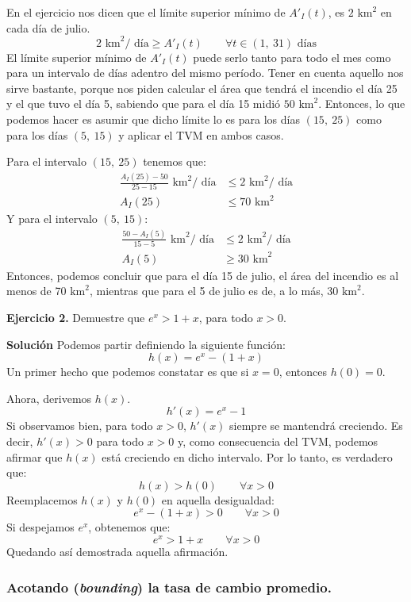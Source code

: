 \documentclass[12pt]{article}
\begin{document}
En el ejercicio nos dicen que el límite superior mínimo de $A'_{I}(t)$, es $2 \text{ km}^{2}$ en cada día de julio.
\[
  2 \text{ km}^{2} / \text{ día} \geq A'_{I}(t) \qquad \forall t \in (1, \ 31) \text{ días}
\]
El límite superior mínimo de $A'_{I}(t)$ puede serlo tanto para todo el mes como para un intervalo de días adentro del mismo período. Tener en cuenta aquello nos sirve bastante, porque nos piden calcular el área que tendrá el incendio el día 25 y el que tuvo el día 5, sabiendo que para el día 15 midió $50 \text{ km}^{2}$. Entonces, lo que podemos hacer es asumir que dicho límite lo es para los días $(15, \ 25)$ como para los días $(5, \ 15)$ y aplicar el TVM en ambos casos.

Para el intervalo $(15, \ 25)$ tenemos que:
\begin{align*}
\frac{A_{I}(25) - 50}{25 - 15} \text{ km}^{2}/ \text{ día} &\leq 2 \text{ km}^{2}/ \text{ día} \\
A_{I}(25) &\leq 70 \text{ km}^{2}
\end{align*}
Y para el intervalo $(5, \ 15)$:
\begin{align*}
\frac{50 - A_{I}(5)}{15 - 5} \text{ km}^{2}/ \text{ día} &\leq 2 \text{ km}^{2}/ \text{ día} \\
A_{I}(5) &\geq 30 \text{ km}^{2}
\end{align*}
Entonces, podemos concluir que para el día 15 de julio, el área del incendio es al menos de 70 $\text{km}^{2}$, mientras que para el 5 de julio es de, a lo más, 30 $\text{km}^{2}$.

\textbf{Ejercicio 2.} \quad Demuestre que $e^{x} > 1 + x$, para todo $x > 0$.

\textbf{Solución} \quad Podemos partir definiendo la siguiente función:
\[
  h(x) = e^{x} - (1 + x)
\]
Un primer hecho que podemos constatar es que si $x = 0$, entonces $h(0) = 0$.

Ahora, derivemos $h(x)$.
\[
  h'(x) = e^{x} - 1
\]
Si observamos bien, para todo $x > 0$, $h'(x)$ siempre se mantendrá creciendo. Es decir, $h'(x) > 0$ para todo $x > 0$ y, como consecuencia del TVM, podemos afirmar que $h(x)$ está creciendo en dicho intervalo. Por lo tanto, es verdadero que:
\[
  h(x) > h(0) \qquad \forall x > 0
\]
Reemplacemos $h(x)$ y $h(0)$ en aquella desigualdad:
\[
  e^{x} - (1 + x) > 0 \qquad \forall x > 0 
\]
Si despejamos $e^{x}$, obtenemos que:
\[
  e^{x} > 1 + x \qquad \forall x > 0
\]
Quedando así demostrada aquella afirmación.

\subsubsection{Acotando (\textit{bounding}) la tasa de cambio promedio.}
\end{document}
